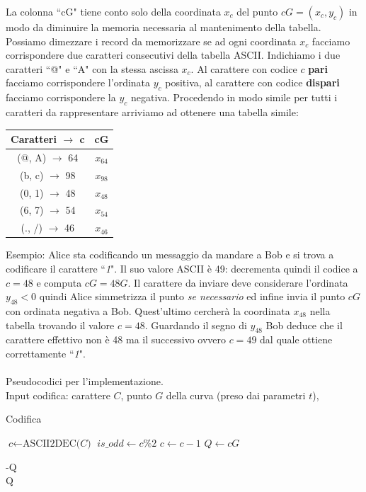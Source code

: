 \documentclass[a4paper,12pt]{tesiinfo}
\begin{document}
La colonna ``cG" tiene conto solo della coordinata $x_c$ del punto $cG=(x_c, y_c)$ in modo da diminuire la memoria necessaria al mantenimento della tabella. Possiamo dimezzare i record da memorizzare se ad ogni coordinata $x_c$ facciamo corrispondere due caratteri consecutivi della tabella ASCII. Indichiamo i due caratteri ``@" e ``A" con la stessa ascissa $x_c$. Al carattere con codice $c$ \textbf{pari} facciamo corrispondere l'ordinata $y_c$ positiva, al carattere con codice \textbf{dispari} facciamo corrispondere la $y_c$ negativa. Procedendo in modo simile per tutti i caratteri da rappresentare arriviamo ad ottenere una tabella simile:
\begin{center}
\begin{tabular}{ c c }
 Caratteri $\to$ c & cG\\
 \hline
 (@, A) $\to$ 64 & $x_{64}$\\
 (b, c) $\to$ 98 & $x_{98}$\\
 (0, 1) $\to$ 48 & $x_{48}$\\
 (6, 7) $\to$ 54 & $x_{54}$\\
 (., /) $\to$ 46 & $x_{46}$
 \label{decodifica2}
\end{tabular}
\end{center}
Esempio: Alice sta codificando un messaggio da mandare a Bob e si trova a codificare il carattere ``\emph{1}". Il suo valore ASCII \`e 49: decrementa quindi il codice a $c=48$ e computa $cG=48G$. Il carattere da inviare deve considerare l'ordinata $y_{48}<0$ quindi Alice simmetrizza il punto \textit{se necessario} ed infine invia il punto $cG$ con ordinata negativa a Bob. Quest'ultimo cercher\`a la coordinata $x_{48}$ nella tabella trovando il valore $c=48$. Guardando il segno di $y_{48}$ Bob deduce che il carattere effettivo non \`e 48 ma il successivo ovvero $c=49$ dal quale ottiene correttamente ``\emph{1}".
\\
\\
Pseudocodici per l'implementazione.
\\
Input codifica: carattere $C$, punto $G$ della curva (preso dai parametri $t$),
\begin{algorithm}[H]
\caption{Codifica}
\begin{algorithmic}
\State $\textit{c} \gets \text{ASCII2DEC}\textit{(C)}$ 
\State $is\_odd \gets \textit{c\%2}$
\State $c \gets c-1$ 
\EndIf
\State $Q \gets cG$

\Return -Q
\EndIf\\
\Return Q
\end{algorithmic}
\end{algorithm}
\end{document}
